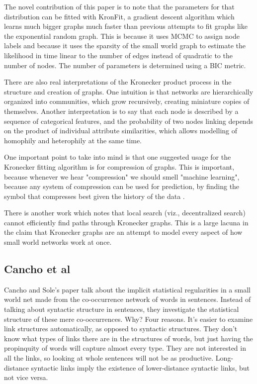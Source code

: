 \documentclass[12pt]{article}
\begin{document}
The novel contribution of this paper is to note that the parameters for that distribution can be fitted with KronFit, a gradient descent algorithm which learns much bigger graphs much faster than previous attempts to fit graphs like the exponential random graph. This is because it uses MCMC to assign node labels and because it uses the sparsity of the small world graph to estimate the likelihood in time linear to the number of edges instead of quadratic to the number of nodes. The number of parameters is determined using a BIC metric.

There are also real interpretations of the Kronecker product process in the structure and creation of graphs. One intuition is that networks are hierarchically organized into communities, which grow recursively, creating miniature copies of themselves. Another interpretation is to say that each node is described by a sequence of categorical features, and the probability of two nodes linking depends on the product of individual attribute similarities, which allows modelling of homophily and heterophily at the same time.

One important point to take into mind is that one suggested usage for the Kronecker fitting algorithm is for compression of graphs. This is important, because whenever we hear "compression" we should smell "machine learning", because any system of compression can be used for prediction, by finding the symbol that compresses best given the history of the data \cite{mlcompression}.

There is another work which notes that local search (viz., decentralized search) cannot efficiently find paths through Kronecker graphs. This is a large lacuna in the claim that Kronecker graphs are an attempt to model every aspect of how small world networks work at once\cite{stochkrongraph}.

\subsection{Cancho et al}

Cancho and Sole's paper talk about the implicit statistical regularities in a small world net made from the co-occurrence network of words in sentences. Instead of talking about syntactic structure in sentences, they investigate the statistical structure of these mere co-occurrences. Why? Four reasons. It's easier to examine link structures automatically, as opposed to syntactic structures. They don't know what types of links there are in the structures of words, but just having the propinquity of words will capture almost every type. They are not interested in all the links, so looking at whole sentences will not be as productive. Long-distance syntactic links imply the existence of lower-distance syntactic links, but not vice versa.
\end{document}
